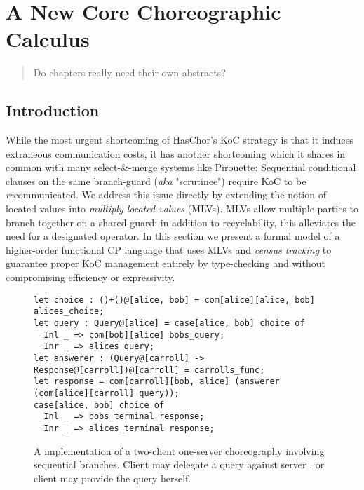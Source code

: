 \chapter{A New Core Choreographic Calculus}
\label{sec:formalism}

\begin{quote}
Do chapters really need their own abstracts?
\end{quote}


\section{Introduction}
While the most urgent shortcoming of HasChor's KoC strategy is that it induces extraneous communication costs,
it has another shortcoming which it shares in common with many select-\&-merge systems like Pirouette:
Sequential conditional clauses on the same branch-guard (\textit{aka} "scrutinee") require KoC to be \emph{re}communicated.
We address this issue directly by extending the notion of located values into \emph{multiply located values} (MLVs).
MLVs allow multiple parties to branch together on a shared guard;
in addition to recyclability, this alleviates the need for a designated  operator.
In this section we present a formal model of a higher-order functional CP language that uses MLVs and \emph{census tracking}
to guarantee proper KoC management entirely by type-checking and without compromising efficiency or expressivity.

\begin{figure}[tbhp]
    \begin{mdframed}
    \begin{verbatim}
let choice : ()+()@[alice, bob] = com[alice][alice, bob] alices_choice;
let query : Query@[alice] = case[alice, bob] choice of
  Inl _ => com[bob][alice] bobs_query;
  Inr _ => alices_query;
let answerer : (Query@[carroll] -> Response@[carroll])@[carroll] = carrolls_func;
let response = com[carroll][bob, alice] (answerer (com[alice][carroll] query));
case[alice, bob] choice of
  Inl _ => bobs_terminal response;
  Inr _ => alices_terminal response;
    \end{verbatim}
    \caption{A \HLSCentral implementation of a two-client one-server choreography involving sequential branches.
        Client  may delegate a query against server ,
        or client  may provide the query herself.}
    \label{fig:our-client-server}
    \end{mdframed}
\end{figure}

